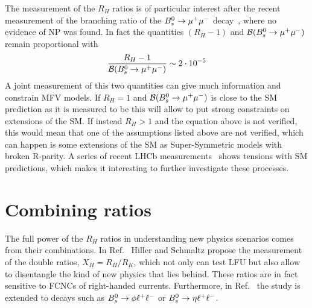 The measurement of the $R_H$ ratios is of particular interest after the recent
measurement of the branching ratio of the ${{B}^0_{s}}\rightarrow{\ensuremath{\mu^+\mu^-}}$ decay~\cite{CMS:2014xfa}, 
where no evidence of NP was found. In fact the quantities $(R_H - 1)$ and
${\cal B}({{B}^0_{s}} \rightarrow {\ensuremath{\mu^+\mu^-}})$ remain proportional with
%
\begin{equation}
\frac{R_H - 1}{{\cal B}({{B}^0_{s}} \rightarrow {\ensuremath{\mu^+\mu^-}})} \sim 2 \cdot 10^{-5}
\end{equation}
%
A joint measurement of this two quantities can give much information and constrain MFV models.
If $R_H = 1$ and ${\cal B}({{B}^0_{s}} \rightarrow {\ensuremath{\mu^+\mu^-}})$ is close to the SM prediction as it is measured to be
this will allow to put strong constraints on extensions of the SM.
If instead $R_H > 1$ and the equation above is not verified, this would mean that one of the
assumptions listed above are not verified, which can happen is some extensions of the SM
as Super-Symmetric models with broken R-parity.
A series of recent LHCb measurements~\cite{TomRDreview} shows tensions with
SM predictions, which makes it interesting to further investigate these processes.

\section{Combining ratios}

The full power of the $R_H$ ratios in understanding new physics scenarios comes from
their combinations.  In Ref.~\cite{Hiller:2014ula} Hiller and Schmaltz propose the measurement 
of the double ratios, $X_H = R_H / R_K$, which not only can test LFU but also allow
to disentangle the kind of new physics that lies behind. These ratios are in fact sensitive
to FCNCs of right-handed currents. Furthermore, in Ref.~\cite{Hiller:2014ula} the study is extended
to \Bs decays such as ${{B}^0_{s}}\rightarrow\phi\ell^+ \ell^-$ or $\Bs\to\eta\ll$.

